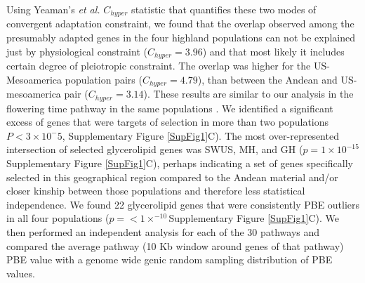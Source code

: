 \documentclass[9pt,twocolumn,twoside,lineno]{BioRxiv}
\begin{document}
Using Yeaman's \textit{et al.} $C_{hyper}$ statistic \cite{yeaman2018} that quantifies these two modes of convergent adaptation constraint, we found that the overlap observed among the presumably adapted genes in the four highland populations can not be explained just by physiological constraint ($C_{hyper} = 3.96$) and that most likely it includes certain degree of pleiotropic constraint.
The overlap was higher for the US-Mesoamerica population pairs ($C_{hyper} = 4.79$), than between the Andean and US-mesoamerica pair ($C_{hyper} = 3.14$).
These results are similar to our analysis in the flowering time pathway in the same populations \cite{Wang2020-mp}.
We identified a significant excess of genes that were targets of selection in more than two populations $P< 3 \times 10^-5$, Supplementary Figure \ref{SupFig1}C).
The most over-represented intersection of selected glycerolipid genes was SWUS, MH, and GH ($p = 1  \times 10 ^{-15} $Supplementary Figure \ref{SupFig1}C), perhaps indicating a set of genes specifically selected in this geographical region compared to the Andean material and/or closer kinship between those populations and therefore less statistical independence.
We found 22 glycerolipid genes that were consistently PBE outliers in all four populations ($p =<1  \times  ^{-10}$Supplementary Figure \ref{SupFig1}C). 
We then performed an independent analysis for each of the 30 pathways and compared the average pathway (10 Kb window around genes of that pathway) PBE value with a genome wide genic random sampling distribution of PBE values. 
\end{document}

